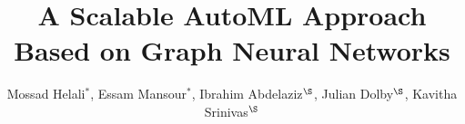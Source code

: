 \documentclass[sigconf, nonacm]{acmart}
\begin{document}
\title{A Scalable AutoML Approach Based on Graph Neural Networks}

\author{Mossad Helali$^\ast$, Essam Mansour$^\ast$, Ibrahim Abdelaziz$^\S$, Julian Dolby$^\S$, Kavitha Srinivas$^\S$}













\maketitle
\end{document}

